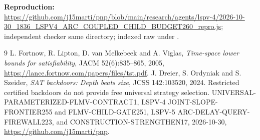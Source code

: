 \documentclass[11pt]{article}
\begin{document}
\noindent\textbf{Reproduction:} \url{https://github.com/j15marti/pnp/blob/main/research/agents/lspv-4/2026-10-30_1836_LSPV4_ARC_COUPLED_CHILD_BUDGET260_repro.js}; independent checker same directory; indexed raw under .

\begin{thebibliography}{9}
 L. Fortnow, R. Lipton, D. van Melkebeek and A. Viglas, \emph{Time-space lower bounds for satisfiability}, JACM 52(6):835--865, 2005, \url{https://lance.fortnow.com/papers/files/tst.pdf}.
 J. Dreier, S. Ordyniak and S. Szeider, \emph{SAT backdoors: Depth beats size}, JCSS 142:103520, 2024. Restricted certified backdoors do not provide free universal strategy selection.
 UNIVERSAL-PARAMETERIZED-FLMV-CONTRACT1, LSPV-4 JOINT-SLOPE-FRONTIER255 and FLMV-CHILD-GATE251, LSPV-5 ARC-DELAY-QUERY-FIREWALL223, and CONSTRUCTION-STRENGTHEN17, 2026-10-30, \url{https://github.com/j15marti/pnp}.
\end{thebibliography}
\end{document}
